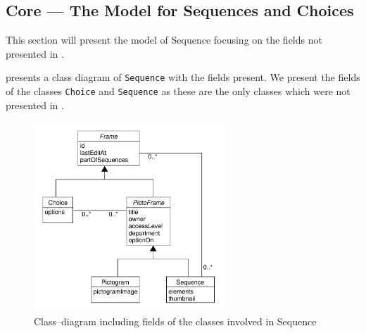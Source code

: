 \subsection{Core --- The Model for Sequences and Choices}\label{subsec:seqcore}
This section will present the model of Sequence focusing on the fields not presented in .

 presents a class diagram of \texttt{Sequence} with the fields present.
We present the fields of the classes \texttt{Choice} and \texttt{Sequence} as these are the only classes which were not presented in .

\begin{figure}[!htb]
    \centering
    \includegraphics[width=0.65\textwidth]{figures/sequencemodel.pdf}
    \caption{Class--diagram including fields of the classes involved in Sequence}\label{fig:sequencemodel}
\end{figure}

